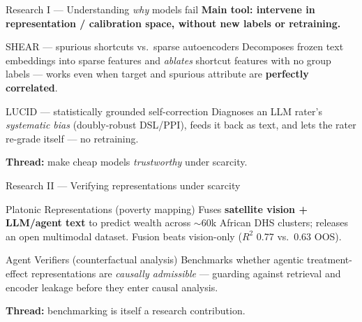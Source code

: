 \documentclass[10pt]{beamer}
\begin{document}
\begin{frame}{Research I — Understanding \emph{why} models fail}
  \textbf{Main tool: intervene in representation / calibration space, without new
  labels or retraining.}
  \vspace{0.5em}
  \begin{block}{SHEAR — spurious shortcuts vs.\ sparse autoencoders}
    Decomposes frozen text embeddings into sparse features and \emph{ablates}
    shortcut features with no group labels — works even when target and spurious
    attribute are \textbf{perfectly correlated}.
  \end{block}
  \begin{block}{LUCID — statistically grounded self-correction}
    Diagnoses an LLM rater's \emph{systematic bias} (doubly-robust DSL/PPI),
    feeds it back as text, and lets the rater re-grade itself — no retraining.
  \end{block}
  \begin{center}
    \small \textbf{Thread:} make cheap models \emph{trustworthy} under scarcity.
  \end{center}
\end{frame}

\begin{frame}{Research II — Verifying representations under scarcity}
  \begin{block}{Platonic Representations (poverty mapping)}
    Fuses \textbf{satellite vision + LLM/agent text} to predict wealth across
    $\sim$60k African DHS clusters; releases an open multimodal dataset.
    Fusion beats vision-only ($R^2$ 0.77 vs.\ 0.63 OOS).
  \end{block}
  \begin{block}{Agent Verifiers (counterfactual analysis)}
    Benchmarks whether agentic treatment-effect representations are
    \emph{causally admissible} — guarding against retrieval and encoder leakage
    before they enter causal analysis.
  \end{block}
  \begin{center}
    \small \textbf{Thread:} benchmarking is itself a research contribution.
  \end{center}
\end{frame}
\end{document}
